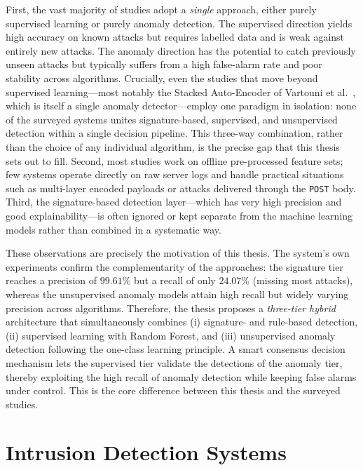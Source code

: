 \documentclass[../main.tex]{subfiles}
\begin{document}
First, the vast majority of studies adopt a \emph{single} approach,
either purely supervised learning or purely anomaly detection. The
supervised direction yields high accuracy on known attacks but requires
labelled data and is weak against entirely new attacks. The anomaly
direction has the potential to catch previously unseen attacks but
typically suffers from a high false-alarm rate and poor stability across
algorithms. Crucially, even the studies that move beyond supervised
learning---most notably the Stacked Auto-Encoder of Vartouni et
al.~\cite{vartouni2018}, which is itself a single anomaly detector---employ
one paradigm in isolation: none of the surveyed systems unites
signature-based, supervised, and unsupervised detection within a single
decision pipeline. This three-way combination, rather than the choice of any
individual algorithm, is the precise gap that this thesis sets out to fill.
Second, most studies work on offline pre-processed feature
sets; few systems operate directly on raw server logs and handle practical
situations such as multi-layer encoded payloads or attacks delivered
through the \texttt{POST} body. Third, the signature-based detection
layer---which has very high precision and good explainability---is often
ignored or kept separate from the machine learning models rather than
combined in a systematic way.

These observations are precisely the motivation of this thesis. The
system's own experiments confirm the complementarity of the approaches:
the signature tier reaches a precision of $99.61\%$ but a recall of only
$24.07\%$ (missing most attacks), whereas the unsupervised anomaly models
attain high recall but widely varying precision across algorithms.
Therefore, the thesis proposes a \emph{three-tier hybrid} architecture
that simultaneously combines (i) signature- and rule-based detection,
(ii) supervised learning with Random Forest, and (iii) unsupervised
anomaly detection following the one-class learning principle. A smart
consensus decision mechanism lets the supervised tier validate the
detections of the anomaly tier, thereby exploiting the high recall of
anomaly detection while keeping false alarms under control. This is the
core difference between this thesis and the surveyed studies.

\section{Intrusion Detection Systems}
\label{sec:ids}
\end{document}
